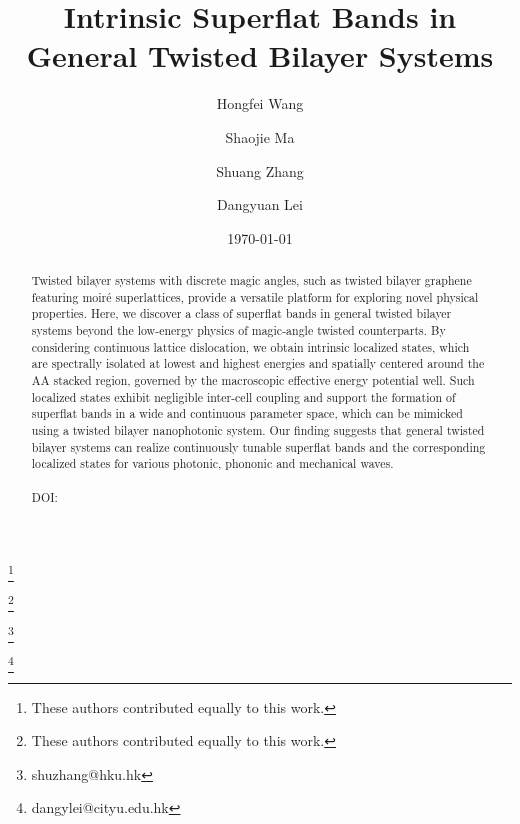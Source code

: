 \documentclass[%
reprint,
amsmath,amssymb,amsfonts
aps,
superscriptaddress,
prx
]{revtex4-1}
\begin{document}
\title{Intrinsic Superflat Bands in General Twisted Bilayer Systems}%
\author{Hongfei Wang}
\thanks{These authors contributed equally to this work.} 
\author{Shaojie Ma} 
\thanks{These authors contributed equally to this work.} 
\author{Shuang Zhang} 
\thanks{shuzhang@hku.hk} 
\author{Dangyuan Lei} 
\thanks{dangylei@cityu.edu.hk} 

\date{\today}

\begin{abstract}
Twisted bilayer systems with discrete magic angles, such as twisted bilayer graphene featuring moir\'{e} superlattices, provide a versatile platform for exploring novel physical properties. Here, we discover a class of superflat bands in general twisted bilayer systems beyond the low-energy physics of magic-angle twisted counterparts. By considering continuous lattice dislocation, we obtain intrinsic localized states, which are spectrally isolated at lowest and highest energies and spatially centered around the AA stacked region, governed by the macroscopic effective energy potential well. Such localized states exhibit negligible inter-cell coupling and support the formation of superflat bands in a wide and continuous parameter space, which can be mimicked using a twisted bilayer nanophotonic system. Our finding suggests that general twisted bilayer systems can realize continuously tunable superflat bands and the corresponding localized states for various photonic, phononic and mechanical waves. 
\\
\\
DOI: \href{https://doi.org}{\color{blue}{URL}}
\end{abstract}
\end{document}
